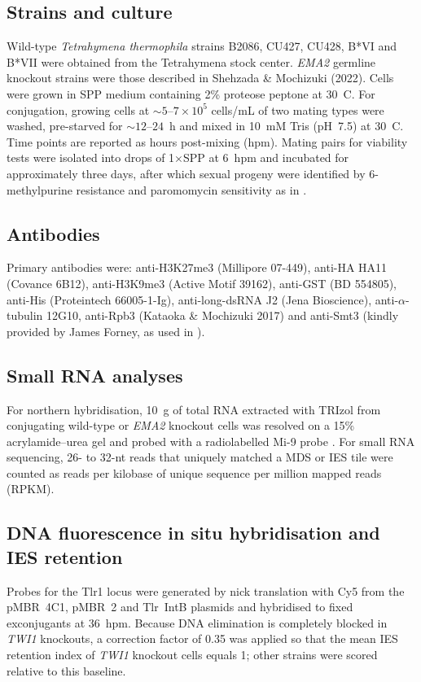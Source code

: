 \documentclass[11pt]{article}
\begin{document}
\subsection{Strains and culture}
Wild-type \emph{Tetrahymena thermophila} strains B2086, CU427, CU428,
B*VI and B*VII were obtained from the Tetrahymena stock center. \emph{EMA2}
germline knockout strains were those described in Shehzada \& Mochizuki
(2022). Cells were grown in SPP medium containing 2\% proteose peptone at
30~\textdegree C. For conjugation, growing cells at $\sim5$--$7\times10^5$
cells/mL of two mating types were washed, pre-starved for $\sim12$--$24$~h
and mixed in 10~mM Tris (pH~7.5) at 30~\textdegree C. Time points are
reported as hours post-mixing (hpm). Mating pairs for viability tests were
isolated into drops of 1$\times$SPP at 6~hpm and incubated for
approximately three days, after which sexual progeny were identified by
6-methylpurine resistance and paromomycin sensitivity as in
\citet{mochizuki2002twi1}.

\subsection{Antibodies}
Primary antibodies were: anti-H3K27me3 (Millipore 07-449), anti-HA HA11
(Covance 6B12), anti-H3K9me3 (Active Motif 39162), anti-GST (BD 554805),
anti-His (Proteintech 66005-1-Ig), anti-long-dsRNA J2 (Jena Bioscience),
anti-$\alpha$-tubulin 12G10, anti-Rpb3 (Kataoka \& Mochizuki 2017) and
anti-Smt3 (kindly provided by James Forney, as used in
\citealp{nasir2015sumo}).

\subsection{Small RNA analyses}
For northern hybridisation, 10~\textmu g of total RNA extracted with TRIzol
from conjugating wild-type or \emph{EMA2} knockout cells was resolved on a
15\% acrylamide--urea gel and probed with a radiolabelled Mi-9 probe
\citep{aronica2008ema1}. For small RNA sequencing, 26- to 32-nt reads that
uniquely matched a MDS or IES tile were counted as reads per kilobase of
unique sequence per million mapped reads (RPKM).

\subsection{DNA fluorescence in situ hybridisation and IES retention}
Probes for the Tlr1 locus were generated by nick translation with Cy5
from the pMBR~4C1, pMBR~2 and Tlr~IntB plasmids and hybridised to fixed
exconjugants at 36~hpm. Because DNA elimination is completely blocked in
\emph{TWI1} knockouts, a correction factor of 0.35 was applied so that
the mean IES retention index of \emph{TWI1} knockout cells equals 1; other
strains were scored relative to this baseline.
\end{document}
